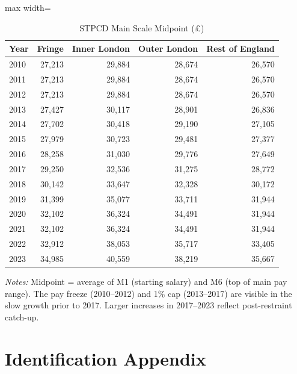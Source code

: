 \documentclass[12pt]{article}
\begin{document}
\begin{table}[H]
\centering
\caption{STPCD Main Scale Midpoint (\pounds)}
\label{tab:stpcd}
\begin{threeparttable}
\begin{adjustbox}{max width=\textwidth}
\begin{tabular}{lrrrr}
\toprule
Year & Fringe & Inner London & Outer London & Rest of England \\
\midrule
2010 & 27,213 & 29,884 & 28,674 & 26,570 \\
2011 & 27,213 & 29,884 & 28,674 & 26,570 \\
2012 & 27,213 & 29,884 & 28,674 & 26,570 \\
2013 & 27,427 & 30,117 & 28,901 & 26,836 \\
2014 & 27,702 & 30,418 & 29,190 & 27,105 \\
2015 & 27,979 & 30,723 & 29,481 & 27,377 \\
2016 & 28,258 & 31,030 & 29,776 & 27,649 \\
2017 & 29,250 & 32,536 & 31,275 & 28,772 \\
2018 & 30,142 & 33,647 & 32,328 & 30,172 \\
2019 & 31,399 & 35,077 & 33,711 & 31,944 \\
2020 & 32,102 & 36,324 & 34,491 & 31,944 \\
2021 & 32,102 & 36,324 & 34,491 & 31,944 \\
2022 & 32,912 & 38,053 & 35,717 & 33,405 \\
2023 & 34,985 & 40,559 & 38,219 & 35,667 \\
\bottomrule
\end{tabular}
\end{adjustbox}
\begin{tablenotes}[flushleft]
\small
\item \textit{Notes:} Midpoint = average of M1 (starting salary) and M6 (top of main pay range). The pay freeze (2010--2012) and 1\% cap (2013--2017) are visible in the slow growth prior to 2017. Larger increases in 2017--2023 reflect post-restraint catch-up.
\end{tablenotes}
\end{threeparttable}
\end{table}


\section{Identification Appendix}
\label{app:id}
\end{document}
